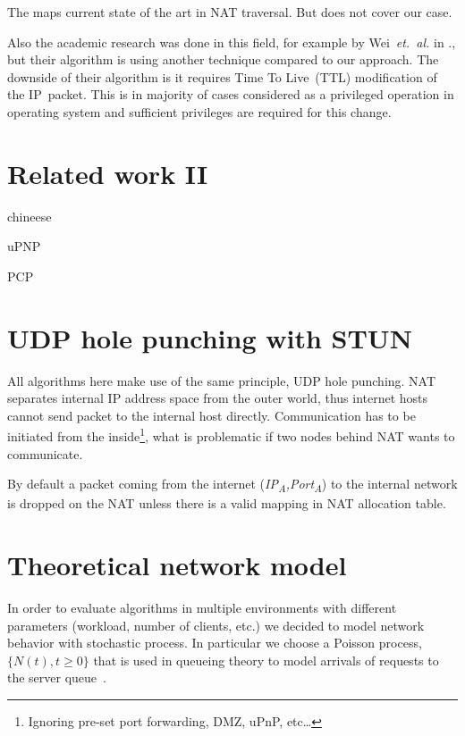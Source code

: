 \documentclass[twoside]{article}
\begin{document}
\begin{multicols}{2}
The \citep{rfc5128} maps current state of the art in NAT traversal. But does not cover our case.

Also the academic research was done in this field, for example by Wei~\emph{et.~al.} in \citep{wei}., but their algorithm is using another technique compared
to our approach. The downside of their algorithm is it requires Time To Live~(TTL) modification of the IP~packet. This is in majority of cases considered
as a privileged operation in operating system and sufficient privileges are required for this change. 

\section{Related work II}
\begin{compactitem}
\item chineese\citep{Wang:2006:RSN:1156422.1156550}
\item uPNP
\item PCP~\citep{rfc6887}
\end{compactitem}

\section{UDP hole punching with STUN}
All algorithms here make use of the same principle, UDP hole punching. NAT separates internal
IP address space from the outer world, thus internet hosts cannot send packet to the 
internal host directly. Communication has to be initiated from the inside\footnote{Ignoring 
pre-set port forwarding, DMZ, uPnP, etc\dots}, what is problematic if two nodes behind 
NAT wants to communicate. 



By default a packet 
coming from the internet (\textit{IP\textsubscript{A},Port\textsubscript{A}}) to the internal 
network is dropped on the NAT unless there is a valid mapping in NAT allocation table.

\section{Theoretical network model}
In order to evaluate algorithms in multiple environments with different parameters (workload, number of clients, etc.)
we decided to model network behavior with stochastic process. In particular we choose a Poisson process, $\{N(t), t\geq0\}$ 
that is used in queueing theory to model arrivals of requests to the server queue~\citep{Nelson:1995:PSP:207382}. 


\end{multicols}
\end{document}
